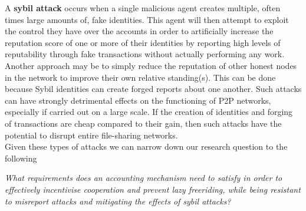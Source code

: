 \noindent{}A {\bf sybil attack} occurs when a single malicious agent creates multiple, often times large amounts of, fake identities. This agent will then attempt to exploit the control they have over the accounts in order to artificially increase the reputation score of one or more of their identities by reporting high levels of reputability through fake transactions without actually performing any work. Another approach may be to simply reduce the reputation of other honest nodes in the network to improve their own relative standing(s). This can be done because Sybil identities can create forged reports about one another. Such attacks can have strongly detrimental effects on the functioning of P2P networks, especially if carried out on a large scale. If the creation of identities and forging of transactions are cheap compared to their gain, then such attacks have the potential to disrupt entire file-sharing networks.  \vspace{1em}\\

\noindent{}Given these types of attacks we can narrow down our research question to the following
\begin{center}
{\it What requirements does an accounting mechanism need to satisfy in order to effectively incentivise cooperation and prevent lazy freeriding, while being resistant to misreport attacks and mitigating the effects of sybil attacks?}
\end{center}

